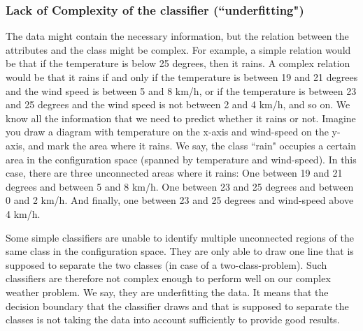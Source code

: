 \documentclass[10pt,a4paper]{article}
\begin{document}
\subsubsection{Lack of Complexity of the classifier (``underfitting")}
The data might contain the necessary information, but the relation between the attributes and the class might be complex. For example, a simple relation would be that if the temperature is below 25 degrees, then it rains. A complex relation would be that it rains if and only if the temperature is between 19 and 21 degrees and the wind speed is between 5 and 8 km/h, or if the temperature is between 23 and 25 degrees and the wind speed is not between 2 and 4 km/h, and so on. We know all the information that we need to predict whether it rains or not.
Imagine you draw a diagram with temperature on the x-axis and wind-speed on the y-axis, and mark the area where it rains. We say, the class ``rain" occupies a certain area in the configuration space (spanned by temperature and wind-speed). In this case, there are three unconnected areas where it rains: One between 19 and 21 degrees and between 5 and 8 km/h. One between 23 and 25 degrees and between 0 and 2 km/h. And finally, one between 23 and 25 degrees and wind-speed above 4 km/h.

Some simple classifiers are unable to identify multiple unconnected regions of the same class in the configuration space. They are only able to draw one line that is supposed to separate the two classes (in case of a two-class-problem). Such classifiers are therefore not complex enough to perform well on our complex weather problem. We say, they are underfitting the data. It means that the decision boundary that the classifier draws and that is supposed to separate the classes is not taking the data into account sufficiently to provide good results.
\end{document}
